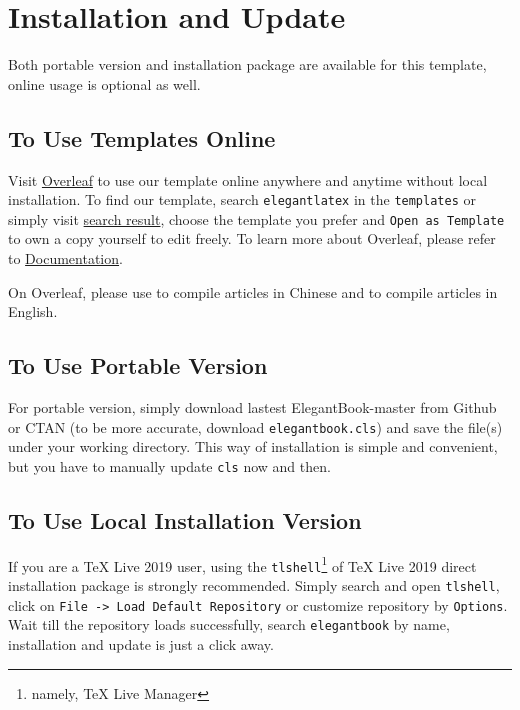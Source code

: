 \documentclass[11pt]{elegantbook}
\begin{document}
\section{Installation and Update}
Both portable version and installation package are available for this template, online usage is optional as well.

\subsection{To Use Templates Online}
Visit \href{https://www.overleaf.com/}{Overleaf} to use our template online anywhere and anytime without local installation. To find our template, search \lstinline{elegantlatex} in the \lstinline{templates} or simply visit \href{https://www.overleaf.com/latex/templates?addsearch=elegantlatex}{search result}, choose the template you prefer and \lstinline{Open as Template} to own a copy yourself to edit freely. To learn more about Overleaf, please refer to \href{https://www.overleaf.com/learn}{Documentation}.

\begin{remark}
  On Overleaf, please use  to compile articles in Chinese and  to compile articles in English.
\end{remark}

\subsection{To Use Portable Version}
For portable version, simply download lastest ElegantBook-master from Github or CTAN (to be more accurate, download \lstinline{elegantbook.cls}) and save the file(s) under your working directory. This way of installation is simple and convenient, but you have to manually update \lstinline{cls} now and then.

\subsection{To Use Local Installation Version}
If you are a \TeX{} Live 2019 user, using the \lstinline{tlshell}\footnote{namely, \TeX{} Live Manager} of \TeX{} Live 2019 direct installation package is strongly recommended. Simply search and open \lstinline{tlshell}, click on \lstinline{File -> Load Default Repository} or customize repository by \lstinline{Options}. Wait till the repository loads successfully, search \lstinline{elegantbook} by name, installation and update is just a click away.
\end{document}
